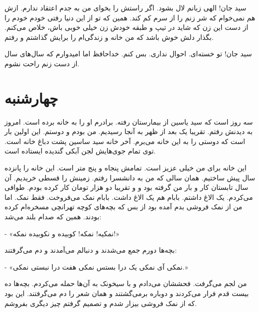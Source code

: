 \documentclass[12pt,a4paper]{book}
\begin{document}
سید جان! الهی زبانم لال بشود. اگر راستش را بخوای من به جدم اعتقاد ندارم. ازش هم نمی‌خوام که شر زنم را از سرم کم کند. همین که تو از این دنیا رفتی خودم خودم را از دست این زن که شاید در تیپ و طبقه خودش زن خیلی خوبی باش، خلاص می‌کنم. بگذار دلش خوش باشد که من خانه و زندگی‌ام را برایش گذاشتم و رفتم.

سید جان! تو خسته‌ای. احوال نداری. بس کنم. خداحافظ اما امیدوارم که سال‌های سال از دست زنم راحت نشوم.

\chapter{چهارشنبه}

سه روز است که سید یاسین از بیمارستان رفته. برادرم او را به خانه برده است. امروز به دیدنش رفتم. تقریبا یک بعد از ظهر به آنجا رسیدیم. من بودم و دوستم. این اولین بار است که دوستی را به این خانه می‌برم. آخر خانه سید ساسین پشت دباغ خانه است. توی تمام جوی‌هایش لجن آبکی گندیده ایستاده است.

این خانه برای من خیلی عزیز است. تمامش پنجاه و پنج متر است. این خانه را پانزده سال پیش ساختیم. همان سالی که من به دانشسرا رفتم. زمینش را قسطی خریدیم. آن سال تابستان کار و بار من گرفته بود و و تقریبا دو هزار تومان کار کرده بودم. طوافی می‌کردم. یک الاغ داشتم. بابام هم یک الاغ داشت. بابام نمک می‌فروخت. فقط نمک. اما من از نمک فروشی بدم آمده بود از بس که بچه‌های کوچه تهرانچی مسخره‌ام کرده بودند. همین که صدام بلند می‌شد:

- «نمکیه! نمکه! کوبیده و نکوبیده نمکه!»

بچه‌ها دورم جمع می‌شدند و دنبالم می‌آمدند و دم می‌گرفتند:

- «نمکی آی نمکی یک درا بستس نمکی هفت درا نبستی نمکی.»

من لجم می‌گرفت. فحششان می‌دادم و با سیخونک به آن‌ها حمله می‌کردم. بچه‌ها ده بیست قدم فرار می‌کردند و دوباره برمی‌گشتند و همان شعر را دم می‌گرفتند. این بود که از نمک فروشی بیزار شدم و تصمیم گرفتم چیز دیگری بفروشم.
\end{document}
